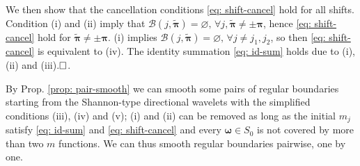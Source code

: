We then show that the cancellation conditions \eqref{eq: shift-cancel} hold for all shifts. Condition (i) and (ii) imply that $\mathcal{B}(j,\widetilde{\boldsymbol{\pi}})= \varnothing,\,\forall j,\widetilde{\boldsymbol{\pi}}\neq \pm \boldsymbol{\pi}$, hence \eqref{eq: shift-cancel} hold for $\widetilde{\boldsymbol{\pi}}\neq \pm \boldsymbol{\pi}$. %
(i) implies $\mathcal{B}(j,\widetilde{\boldsymbol{\pi}}) = \varnothing,\,\forall j\neq j_1,j_2$, so then \eqref{eq: shift-cancel} is equivalent to (iv). %
The identity summation \eqref{eq: id-sum} holds due to (i), (ii) and (iii).$\hfill\square$.

By Prop. \ref{prop: pair-smooth} we can smooth some pairs of regular boundaries starting from the Shannon-type directional wavelets with the simplified conditions (iii), (iv) and (v); (i) and (ii) can be removed as long as the initial $m_j$ satisfy \eqref{eq: id-sum} and \eqref{eq: shift-cancel} and every $\boldsymbol{\omega}\in S_0$ is not covered by more than two $m$ functions. We can thus smooth regular boundaries pairwise, one by one.

